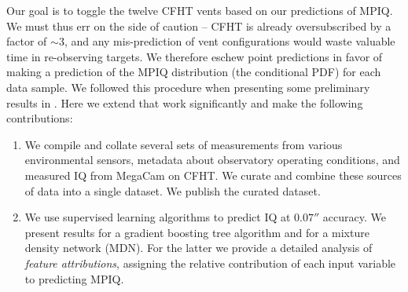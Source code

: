 Our goal is to toggle the twelve CFHT vents based on our predictions of MPIQ. We must thus err on the side of caution -- CFHT is already oversubscribed by a factor of $\sim 3$, and any mis-prediction of vent configurations would waste valuable time in re-observing targets. We therefore eschew point predictions in favor of making a prediction of the MPIQ distribution (the conditional PDF) for each data sample. We followed this procedure when presenting some preliminary results in \cite{gilda_cfht_neurips}. Here we extend that work significantly and make the following contributions:
\begin{enumerate}
    \item We compile and collate several sets of measurements from various environmental sensors, metadata about observatory operating conditions, and measured IQ from MegaCam on CFHT. We curate and combine these sources of data into a single dataset.  We publish the curated dataset.
   \item We use supervised learning algorithms to predict IQ at $0.07''$ accuracy. We present results for a gradient boosting tree algorithm and for a mixture density network (MDN). For the latter we provide a detailed analysis of {\it feature attributions}, assigning the relative contribution of each input variable to predicting MPIQ.
  


\end{enumerate}
